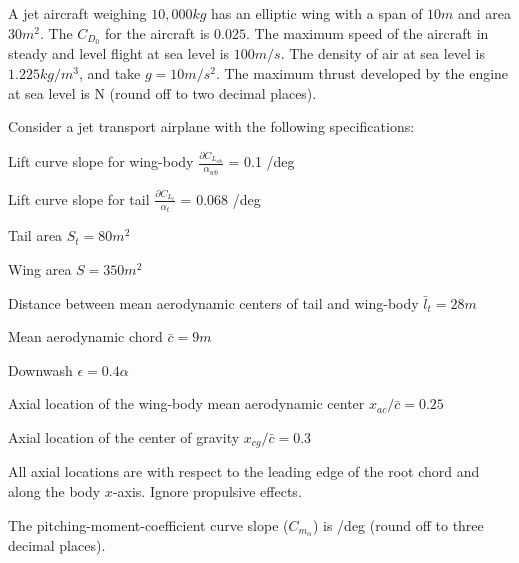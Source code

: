     \item A jet aircraft weighing $10,000 kg$ has an elliptic wing with a span of $10 m$ and area $30 m^2$. The $C_{D_{0}}$ for the aircraft is $0.025$. The maximum speed of the aircraft in steady and level flight at sea level is $100 m/s$. The density of air at sea level is $1.225 kg/m^3$, and take $g = 10 m/s^2$. The maximum thrust developed by the engine at sea level is \underline{\hspace{1cm}} N (round off to two decimal places). 

    \item Consider a jet transport airplane with the following specifications:

        Lift curve slope for wing-body $\frac{\partial C_{L_{wb}}}{\alpha_{wb}}$ = 0.1 /deg

        Lift curve slope for tail $\frac{\partial C_{L_{t}}}{\alpha_{t}}$ = 0.068 /deg

        Tail area $S_{t} = 80 m^2$

        Wing area $S = 350 m^2$

        Distance between mean aerodynamic centers of tail and wing-body $\bar{l}_{t}=28 m$

        Mean aerodynamic chord $\bar{c} = 9m$

        Downwash $\epsilon = 0.4\alpha$

        Axial location of the wing-body mean aerodynamic center $x_{ac}/\bar{c} = 0.25$

        Axial location of the center of gravity $x_{cg}/\bar{c} = 0.3$

        All axial locations are with respect to the leading edge of the root chord and along the body $x$-axis. Ignore propulsive effects.

        The pitching-moment-coefficient curve slope ($C_{m_{\alpha}}$) is \underline{\hspace{1cm}} /deg (round off to three decimal places). 

